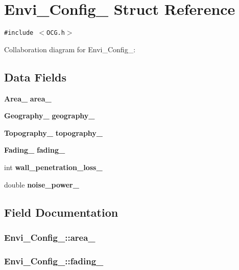 \section{Envi\_\-Config\_\- Struct Reference}
\label{structEnvi__Config__}
{\tt \#include $<$OCG.h$>$}

Collaboration diagram for Envi\_\-Config\_\-:\subsection*{Data Fields}
\begin{CompactItemize}
\item 
{\bf Area\_\-} {\bf area\_\-}
\item 
{\bf Geography\_\-} {\bf geography\_\-}
\item 
{\bf Topography\_\-} {\bf topography\_\-}
\item 
{\bf Fading\_\-} {\bf fading\_\-}
\item 
int {\bf wall\_\-penetration\_\-loss\_\-}
\item 
double {\bf noise\_\-power\_\-}
\end{CompactItemize}


\subsection{Field Documentation}
\subsubsection[{area\_\-}]{ {\bf Envi\_\-Config\_\-::area\_\-}}\label{structEnvi__Config___e2daeb677b9fce51405bd7cabd3a14f0}


\subsubsection[{fading\_\-}]{ {\bf Envi\_\-Config\_\-::fading\_\-}}\label{structEnvi__Config___0f715d03d1eb518e526fdbff1aa8f278}


